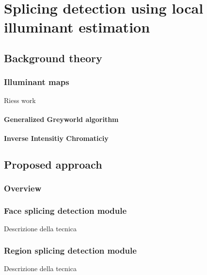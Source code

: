 \chapter{Splicing detection using local illuminant estimation}

\section{Background theory}

\subsection{Illuminant maps}

Riess work

\subsubsection{Generalized Greyworld algorithm}

\subsubsection{Inverse Intensitiy Chromaticiy}


\section{Proposed approach}

\subsection{Overview}

\subsection{Face splicing detection module}

Descrizione della tecnica

\subsection{Region splicing detection module}

Descrizione della tecnica